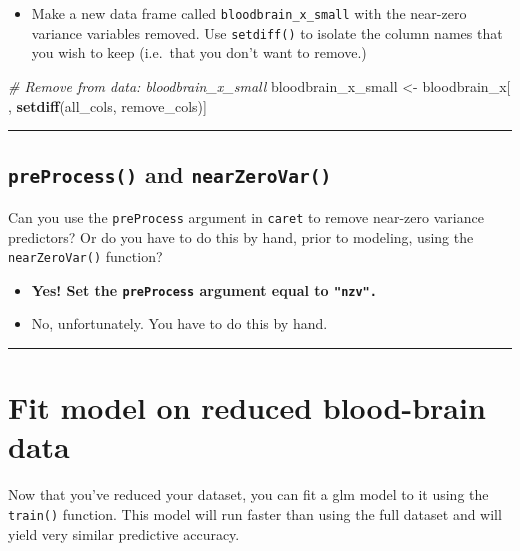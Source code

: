 \documentclass[]{book}
\newenvironment{Shaded}{\begin{snugshade}}{\end{snugshade}}
\newcommand{\KeywordTok}[1]{\textcolor[rgb]{0.13,0.29,0.53}{\textbf{#1}}}
\newcommand{\StringTok}[1]{\textcolor[rgb]{0.31,0.60,0.02}{#1}}
\newcommand{\CommentTok}[1]{\textcolor[rgb]{0.56,0.35,0.01}{\textit{#1}}}
\newcommand{\NormalTok}[1]{#1}
\providecommand{\tightlist}{%
  \setlength{\itemsep}{0pt}\setlength{\parskip}{0pt}}
\begin{document}
\begin{itemize}
\tightlist
\item
  Make a new data frame called \texttt{bloodbrain\_x\_small} with the
  near-zero variance variables removed. Use \texttt{setdiff()} to
  isolate the column names that you wish to keep (i.e.~that you don't
  want to remove.)
\end{itemize}

\begin{Shaded}
\begin{Highlighting}[]
\CommentTok{# Remove from data: bloodbrain_x_small}
\NormalTok{bloodbrain_x_small <-}\StringTok{ }\NormalTok{bloodbrain_x[ , }\KeywordTok{setdiff}\NormalTok{(all_cols, remove_cols)]}
\end{Highlighting}
\end{Shaded}

\begin{center}\rule{0.5\linewidth}{\linethickness}\end{center}

\subsection{\texorpdfstring{\texttt{preProcess()} and
\texttt{nearZeroVar()}}{preProcess() and nearZeroVar()}}\label{preprocess-and-nearzerovar}

Can you use the \texttt{preProcess} argument in \texttt{caret} to remove
near-zero variance predictors? Or do you have to do this by hand, prior
to modeling, using the \texttt{nearZeroVar()} function?

\begin{itemize}
\item
  \textbf{Yes! Set the \texttt{preProcess} argument equal to
  \texttt{"nzv".}}
\item
  No, unfortunately. You have to do this by hand.
\end{itemize}

\begin{center}\rule{0.5\linewidth}{\linethickness}\end{center}

\section{Fit model on reduced blood-brain
data}\label{fit-model-on-reduced-blood-brain-data}

Now that you've reduced your dataset, you can fit a glm model to it
using the \texttt{train()} function. This model will run faster than
using the full dataset and will yield very similar predictive accuracy.
\end{document}
